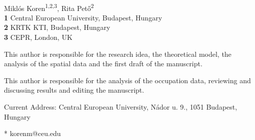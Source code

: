 \documentclass[10pt,letterpaper]{article}
\begin{document}
\vspace*{0.2in}

\begin{flushleft}
{\Large
\textbf{} %
}
\newline
\\
Miklós Koren\textsuperscript{1,2,3\Yinyang\textcurrency*},
Rita Pető\textsuperscript{2\ddag}
\\
\bigskip
\textbf{1} Central European University, Budapest, Hungary
\\
\textbf{2} KRTK KTI, Budapest, Hungary
\\
\textbf{3} CEPR, London, UK
\\
\bigskip

% 
%
\Yinyang This author is responsible for the research idea, the theoretical model, the analysis of the spatial data and the first draft of the manuscript.

\ddag This author is responsible for the analysis of the occupation data, reviewing and discussing results and editing the manuscript.

\textcurrency Current Address: Central European University, Nádor u. 9., 1051 Budapest, Hungary %

* korenm@ceu.edu

\end{flushleft}
\end{document}
